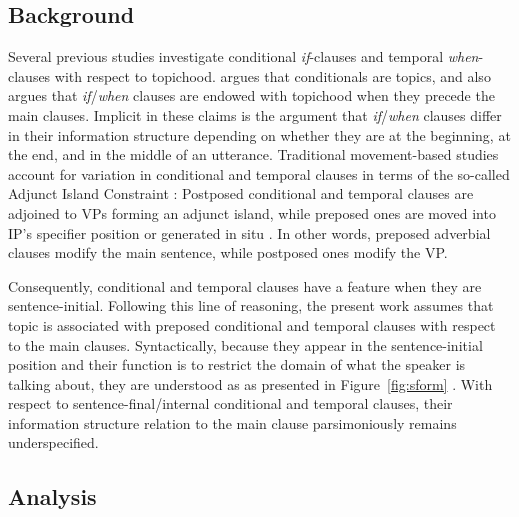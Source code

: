 \subsection{Background} 
\label{10:ssec:adjunct:background}



Several previous studies investigate conditional \textit{if}-clauses
and temporal \textit{when}-clauses with respect to topichood.
\citet{haiman:78} argues that conditionals are topics, and
\citet{ramsay:87} also argues that \textit{if}/\textit{when} clauses
are endowed with topichood when they precede the main clauses.
Implicit in these claims is the argument that
\textit{if}/\textit{when} clauses differ in their information
structure depending on whether they are at the beginning, at the end,
and in the middle of an utterance.  Traditional movement-based studies
account for variation in conditional and temporal clauses in terms of
the so-called Adjunct Island Constraint \citep{huang:82}:
Postposed conditional and temporal clauses are adjoined to VPs forming
an adjunct island, while preposed ones are moved into IP's specifier
position \citep{iatridou:91} or generated in situ
\citep{taylor:07}.  In other words, preposed adverbial clauses modify
the main sentence, while postposed ones modify the VP.



Consequently, conditional and temporal clauses have a  feature
when they are sentence-initial.  Following this line of reasoning, the
present work assumes that topic is associated with preposed
conditional and temporal clauses with respect to the main
clauses. Syntactically, because they appear in the sen\-tence-initial
position and their function is to restrict the domain of what the
speaker is talking about, they are understood as 
as presented in
Figure~\ref{fig:sform} . With
respect to sentence-final/internal conditional and temporal clauses,
their information structure relation to the main clause parsimoniously
remains underspecified.



\subsection{Analysis}
\label{10:ssec:adjunct:analysis}

